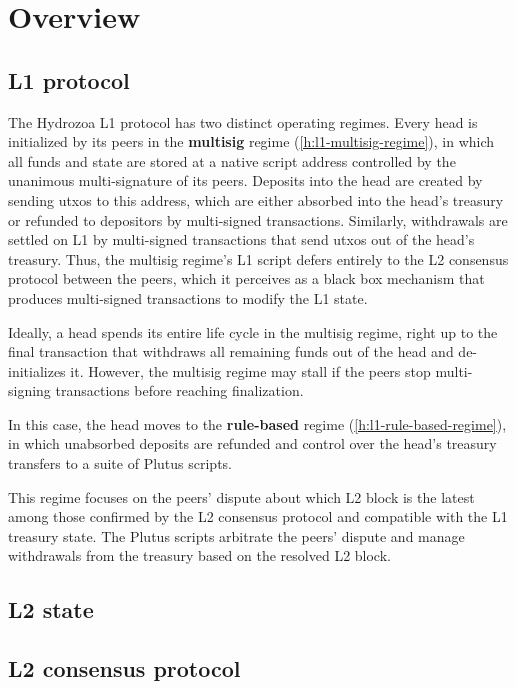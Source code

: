 \documentclass[../hydrozoa.tex]{subfiles}
\begin{document}
\chapter*{Overview}%
\label{h:overview-introduction}%
%


\section*{L1 protocol}%
\label{h:overview-l1-protocol}%
%

The Hydrozoa L1 protocol has two distinct operating regimes.
Every head is initialized by its peers in the \textbf{multisig} regime (\cref{h:l1-multisig-regime}), in which all funds and state are stored at a native script address controlled by the unanimous multi-signature of its peers.
Deposits into the head are created by sending utxos to this address, which are either absorbed into the head's treasury or refunded to depositors by multi-signed transactions.
Similarly, withdrawals are settled on L1 by multi-signed transactions that send utxos out of the head's treasury.
Thus, the multisig regime's L1 script defers entirely to the L2 consensus protocol between the peers, which it perceives as a black box mechanism that produces multi-signed transactions to modify the L1 state.

Ideally, a head spends its entire life cycle in the multisig regime, right up to the final transaction that withdraws all remaining funds out of the head and de-initializes it.
However, the multisig regime may stall if the peers stop multi-signing transactions before reaching finalization.

In this case, the head moves to the \textbf{rule-based} regime (\cref{h:l1-rule-based-regime}), in which unabsorbed deposits are refunded and control over the head's treasury transfers to a suite of Plutus scripts.

This regime focuses on the peers' dispute about which L2 block is the latest among those confirmed by the L2 consensus protocol and compatible with the L1 treasury state.
The Plutus scripts arbitrate the peers' dispute and manage withdrawals from the treasury based on the resolved L2 block.

\section*{L2 state}%
\label{h:overview-l2-state}%
%


\section*{L2 consensus protocol}%
\label{h:overview-l2-consensus-protocol}%
%

\end{document}
